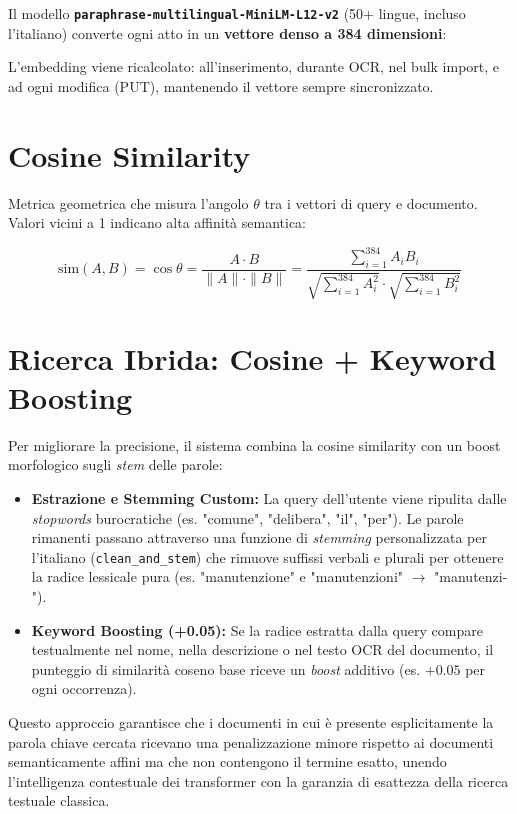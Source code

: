 \documentclass[12pt,a4paper,oneside]{report}
\begin{document}
Il modello \textbf{\texttt{paraphrase-multilingual-MiniLM-L12-v2}} (50+ lingue, incluso
l'italiano) converte ogni atto in un \textbf{vettore denso a 384 dimensioni}:

L'embedding viene ricalcolato: all'inserimento, durante OCR, nel bulk import,
e ad ogni modifica (PUT), mantenendo il vettore sempre sincronizzato.

\section{Cosine Similarity}

Metrica geometrica che misura l'angolo $\theta$ tra i vettori di query e documento.
Valori vicini a 1 indicano alta affinit\`{a} semantica:

\begin{equation}
    \text{sim}(A, B) = \cos\theta =
    \frac{A \cdot B}{\|A\| \cdot \|B\|} =
    \frac{\displaystyle\sum_{i=1}^{384} A_i B_i}
         {\displaystyle\sqrt{\sum_{i=1}^{384} A_i^2} \cdot
          \displaystyle\sqrt{\sum_{i=1}^{384} B_i^2}}
\end{equation}

\section{Ricerca Ibrida: Cosine + Keyword Boosting}

Per migliorare la precisione, il sistema combina la cosine similarity con un
boost morfologico sugli \textit{stem} delle parole:

\begin{itemize}
    \item \textbf{Estrazione e Stemming Custom:} La query dell'utente viene ripulita dalle \textit{stopwords} burocratiche (es. "comune", "delibera", "il", "per"). Le parole rimanenti passano attraverso una funzione di \textit{stemming} personalizzata per l'italiano (\texttt{clean\_and\_stem}) che rimuove suffissi verbali e plurali per ottenere la radice lessicale pura (es. "manutenzione" e "manutenzioni" $\rightarrow$ "manutenzi-").
    \item \textbf{Keyword Boosting (+0.05):} Se la radice estratta dalla query compare testualmente nel nome, nella descrizione o nel testo OCR del documento, il punteggio di similarit\`{a} coseno base riceve un \textit{boost} additivo (es. $+0.05$ per ogni occorrenza).
\end{itemize}

Questo approccio garantisce che i documenti in cui è presente esplicitamente la parola chiave cercata ricevano una penalizzazione minore rispetto ai documenti semanticamente affini ma che non contengono il termine esatto, unendo l'intelligenza contestuale dei transformer con la garanzia di esattezza della ricerca testuale classica.
\end{document}
